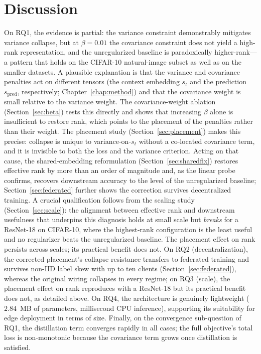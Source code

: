 \section{Discussion}
On RQ1, the evidence is partial: the variance constraint demonstrably
mitigates variance collapse, but at $\beta = 0.01$ the covariance constraint
does not yield a high-rank representation, and the unregularized baseline is
paradoxically higher-rank---a pattern that holds on the CIFAR-10 natural-image
subset as well as on the smaller datasets. A plausible explanation is that the variance and
covariance penalties act on different tensors (the context embedding $s_t$
and the prediction $s_{\text{pred}}$, respectively; Chapter~\ref{chap:method})
and that the covariance weight is small relative to the variance weight. The
covariance-weight ablation (Section~\ref{sec:beta}) tests this directly and
shows that increasing $\beta$ alone is insufficient to restore rank, which
points to the placement of the penalties rather than their weight. The
placement study (Section~\ref{sec:placement}) makes this precise: collapse is
unique to variance-on-$s_t$ without a co-located covariance term, and it is
invisible to both the loss and the variance criterion. Acting on that cause,
the shared-embedding reformulation (Section~\ref{sec:sharedfix}) restores
effective rank by more than an order of magnitude and, as the linear probe
confirms, recovers downstream accuracy to the level of the unregularized
baseline; Section~\ref{sec:federated} further shows the correction survives
decentralized training. A crucial qualification follows from the scaling study
(Section~\ref{sec:scale}): the alignment between effective rank and downstream
usefulness that underpins this diagnosis holds at small scale but \emph{breaks}
for a ResNet-18 on CIFAR-10, where the highest-rank configuration is the least
useful and no regularizer beats the unregularized baseline. The placement
effect on rank persists across scales; its practical benefit does not. On
RQ2 (decentralization), the corrected placement's collapse resistance
transfers to federated training and survives non-IID label skew with up to
ten clients (Section~\ref{sec:federated}), whereas the original wiring
collapses in every regime; on RQ3 (scale), the placement effect on rank
reproduces with a ResNet-18 but its practical benefit does not, as detailed
above. On RQ4, the architecture is genuinely lightweight ($2.84$~MB of
parameters, millisecond CPU inference), supporting its suitability for
edge deployment in terms of size. Finally, on the convergence sub-question
of RQ1, the distillation term converges rapidly in all cases; the full
objective's total loss is non-monotonic because the covariance term grows
once distillation is satisfied.

